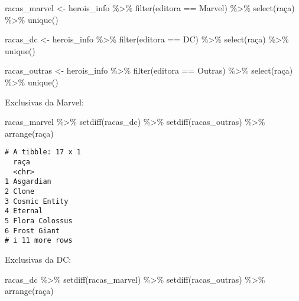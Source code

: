 \documentclass[
  letterpaper,
  DIV=11,
  numbers=noendperiod]{scrreprt}
\newenvironment{Shaded}{\begin{snugshade}}{\end{snugshade}}
\newcommand{\FunctionTok}[1]{\textcolor[rgb]{0.28,0.35,0.67}{#1}}
\newcommand{\NormalTok}[1]{\textcolor[rgb]{0.00,0.23,0.31}{#1}}
\newcommand{\OtherTok}[1]{\textcolor[rgb]{0.00,0.23,0.31}{#1}}
\newcommand{\SpecialCharTok}[1]{\textcolor[rgb]{0.37,0.37,0.37}{#1}}
\newcommand{\StringTok}[1]{\textcolor[rgb]{0.13,0.47,0.30}{#1}}
\begin{document}
\begin{enumerate}
\begin{tcolorbox}
\begin{itemize}
\begin{Shaded}
\begin{Highlighting}[]
\NormalTok{racas\_marvel }\OtherTok{\textless{}{-}}\NormalTok{ herois\_info }\SpecialCharTok{\%\textgreater{}\%} 
  \FunctionTok{filter}\NormalTok{(editora }\SpecialCharTok{==} \StringTok{\textquotesingle{}Marvel\textquotesingle{}}\NormalTok{) }\SpecialCharTok{\%\textgreater{}\%} 
  \FunctionTok{select}\NormalTok{(raça) }\SpecialCharTok{\%\textgreater{}\%} 
  \FunctionTok{unique}\NormalTok{()}

\NormalTok{racas\_dc }\OtherTok{\textless{}{-}}\NormalTok{ herois\_info }\SpecialCharTok{\%\textgreater{}\%} 
  \FunctionTok{filter}\NormalTok{(editora }\SpecialCharTok{==} \StringTok{\textquotesingle{}DC\textquotesingle{}}\NormalTok{) }\SpecialCharTok{\%\textgreater{}\%} 
  \FunctionTok{select}\NormalTok{(raça) }\SpecialCharTok{\%\textgreater{}\%} 
  \FunctionTok{unique}\NormalTok{()}

\NormalTok{racas\_outras }\OtherTok{\textless{}{-}}\NormalTok{ herois\_info }\SpecialCharTok{\%\textgreater{}\%} 
  \FunctionTok{filter}\NormalTok{(editora }\SpecialCharTok{==} \StringTok{\textquotesingle{}Outras\textquotesingle{}}\NormalTok{) }\SpecialCharTok{\%\textgreater{}\%} 
  \FunctionTok{select}\NormalTok{(raça) }\SpecialCharTok{\%\textgreater{}\%} 
  \FunctionTok{unique}\NormalTok{()}
\end{Highlighting}
\end{Shaded}

    Exclusivas da Marvel:

\begin{Shaded}
\begin{Highlighting}[]
\NormalTok{racas\_marvel }\SpecialCharTok{\%\textgreater{}\%} 
  \FunctionTok{setdiff}\NormalTok{(racas\_dc) }\SpecialCharTok{\%\textgreater{}\%} 
  \FunctionTok{setdiff}\NormalTok{(racas\_outras) }\SpecialCharTok{\%\textgreater{}\%} 
  \FunctionTok{arrange}\NormalTok{(raça)}
\end{Highlighting}
\end{Shaded}

\begin{verbatim}
# A tibble: 17 x 1
  raça          
  <chr>         
1 Asgardian     
2 Clone         
3 Cosmic Entity 
4 Eternal       
5 Flora Colossus
6 Frost Giant   
# i 11 more rows
\end{verbatim}

    Exclusivas da DC:

\begin{Shaded}
\begin{Highlighting}[]
\NormalTok{racas\_dc }\SpecialCharTok{\%\textgreater{}\%} 
  \FunctionTok{setdiff}\NormalTok{(racas\_marvel) }\SpecialCharTok{\%\textgreater{}\%} 
  \FunctionTok{setdiff}\NormalTok{(racas\_outras) }\SpecialCharTok{\%\textgreater{}\%} 
  \FunctionTok{arrange}\NormalTok{(raça)}
\end{Highlighting}
\end{Shaded}


\end{itemize}
\end{tcolorbox}
\end{enumerate}
\end{document}
